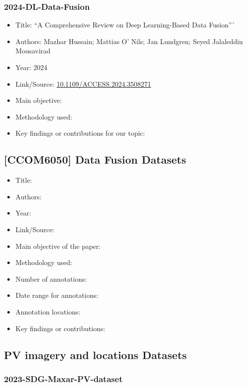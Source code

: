 \subsubsection{2024-DL-Data-Fusion}
\begin{itemize}
    \item Title: ``A Comprehensive Review on Deep Learning-Based Data Fusion'''
    \item Authors: Mazhar Hussain; Mattias O' Nils; Jan Lundgren; Seyed Jalaleddin Mousavirad
    \item Year: 2024
    \item Link/Source: \href{https://doi.org/10.1109/ACCESS.2024.3508271}{10.1109/ACCESS.2024.3508271} 
    \item Main objective: 
    \item Methodology used:
    \item Key findings or contributions for our topic: 
\end{itemize}

\subsection{[CCOM6050] Data Fusion Datasets}

\begin{itemize}
    \item Title: 
    \item Authors:
    \item Year:
    \item Link/Source:
    \item Main objective of the paper:
    \item Methodology used:
    \item Number of annotations:
    \item Date range for annotations:
    \item Annotation locations:
    \item Key findings or contributions:
\end{itemize}

\subsection{PV imagery and locations Datasets}

\subsubsection{2023-SDG-Maxar-PV-dataset}

